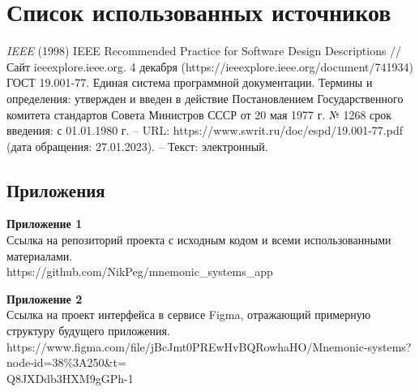 \documentclass[draft]{article}
\newcommand\zz[1]{\par{\normalsize\strut #1} \hfill\ignorespaces}
\begin{document}
\section*{Список использованных источников}
\begin{thebibliography}{}
 \textit{IEEE} (1998) IEEE Recommended Practice for Software Design Descriptions // Сайт ieeexplore.ieee.org. 4 декабря (https://ieeexplore.ieee.org/document/741934)
 ГОСТ 19.001-77. Единая система программной документации. Термины и определения: утвержден и введен в действие Постановлением Государственного комитета стандартов Совета Министров СССР от 20 мая 1977 г. № 1268 срок введения: с 01.01.1980 г. – URL: https://www.swrit.ru/doc/espd/19.001-77.pdf (дата обращения: 27.01.2023). – Текст: электронный.
\end{thebibliography}
\newpage
\begin{center}
\section*{Приложения}
\end{center}
\zz{}\textbf{Приложение 1\\}
Ссылка на репозиторий проекта с исходным кодом и всеми использованными материалами.\\
https://github.com/NikPeg/mnemonic\_systems\_app\\
\zz{}\textbf{Приложение 2\\}
Ссылка на проект интерфейса в сервисе Figma, отражающий примерную структуру будущего приложения.\\
https://www.figma.com/file/jBcJmt0PREwHvBQRowhaHO/Mnemonic-systems?node-id=38\%3A250\&t=\\
Q8JXDdb3HXM9gGPh-1\\
\end{document}
